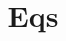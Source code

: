 \documentclass[10pt,a4paper]{article}
\begin{document}
	\title{Eqs}
	
	\author[]{}
%	
%	
%	
%	
%	
%	
	
	\maketitle


%	
%
\end{document}
